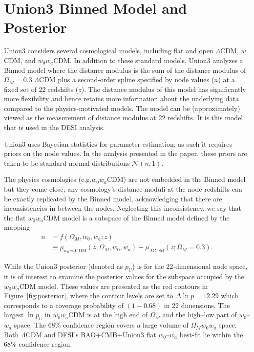 \documentclass[11pt,a4paper]{article}
\begin{document}
\section{Union3 Binned Model and Posterior}
Union3 considers several cosmological models, including  flat and open $\Lambda$CDM, $w$CDM, and $w_0w_a$CDM.
In addition to these standard models,  Union3 analyzes a Binned model where the  distance modulus
is the sum of the distance modulus of $\Omega_M=0.3$  $\Lambda$CDM plus a second-order spline specified by node values ($n$)
at a fixed set of 22 redshifts ($z$).  The distance modulus of this model has significantly more flexibility 
and hence retains more information about the underlying data compared to the physics-motivated models.
The model can be (approximately) viewed as the measurement of distance modulus at 22 redshifts.
It is this model that is used in the DESI analysis.

Union3 uses Bayesian statistics for parameter estimation; as such it requires 
priors on the node values. In the analysis presented in the paper, these priors are taken to be standard normal distributions
$\mathcal{N}(n,1)$.

The physics cosmologies (e.g.$w_0w_a$CDM)  are not embedded in the Binned model but 
they come close; any cosmology's distance moduli at the node redshifts can be exactly replicated by the Binned model, acknowledging that
there are
inconsistencies in between the nodes.  Neglecting this inconsistency, we say that the flat $w_0w_a$CDM model
is a subspace of the Binned model defined by the mapping
\begin{align}
	n &= f(\Omega_M, w_0, w_a; z) \\
	& \equiv \mu_{w_0 w_a \text{CDM}}(z;\Omega_M, w_0, w_a)  - \mu_{\Lambda \text{CDM}}(z;\Omega_M=0.3).
\end{align}

While the Union3 posterior (denoted as $p_U$) is for the 22-dimensional node space, it is of interest to examine the posterior values for the
subspace occupied by the $w_0w_a$CDM
model. 
These values are presented as the red contours in Figure~\ref{fig:posterior}, where the contour levels are set to $\Delta \ln{p}=12.29$ which corresponds
to a coverage probability of $(1-0.68)$ in 22 dimensions.
The largest $\ln{p_U}$ in $w_0w_a$CDM is at the high end of $\Omega_M$ and the high--low
part of $w_0$--$w_a$ space.  The 68\% confidence region covers a large volume of  $\Omega_Mw_0w_a$ 
space.  Both $\Lambda$CDM and DESI's  BAO+CMB+Union3 flat $w_0$--$w_a$ best-fit lie within the 68\% confidence region.
\end{document}
